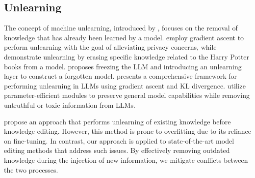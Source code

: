 \subsection{Unlearning}
The concept of machine unlearning, introduced by \citet{cao2015towards}, focuses on the removal of knowledge that has already been learned by a model. 
\citet{jang2022knowledge} employ gradient ascent to perform unlearning with the goal of alleviating privacy concerns, while \citet{eldan2023s} demonstrate unlearning by erasing specific knowledge related to the Harry Potter books from a model. \citet{chen2023unlearn} proposes freezing the LLM and introducing an unlearning layer to construct a forgotten model. \citet{yao-etal-2024-machine} presents a comprehensive framework for performing unlearning in LLMs using gradient ascent and KL divergence. \citet{hu2024separate} utilize parameter-efficient modules to preserve general model capabilities while removing untruthful or toxic information from LLMs.


\citet{ni2024forgettinglearningutilizingparametric} propose an approach that performs unlearning of existing knowledge before knowledge editing. However, this method is prone to overfitting due to its reliance on fine-tuning. In contrast, our approach is applied to state-of-the-art model editing methods that address such issues. By effectively removing outdated knowledge during the injection of new information, we mitigate conflicts between the two processes.